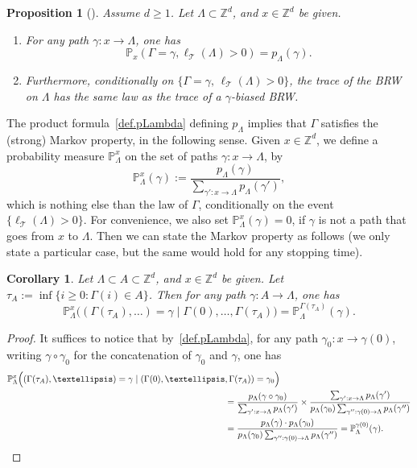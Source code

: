 \documentclass[11pt]{article}
\numberwithin{equation}{section}
\theoremstyle{plain}
\newtheorem{proposition}[theorem]{Proposition}
\newtheorem{corollary}[theorem]{Corollary}
\theoremstyle{definition}
\newcommand\Z{\mathbb{Z}}
\newcommand\T{\mathcal{T}}
\newcommand{\1}{{\text{\Large $\mathfrak 1$}}}
\begin{document}
\begin{proposition}[\cite{Zhu3}] \label{prop.Zhu.spine}
Assume $d\ge 1$. Let $\Lambda\subset \Z^d$,
and $x\in \mathbb Z^d$ be given.
\begin{enumerate}
\item For any path $\gamma:x\to \Lambda$, one has
\begin{equation*}%
\mathbb P_x(\Gamma = \gamma, \ell_{\T}(\Lambda)>0)=p_\Lambda(\gamma).
\end{equation*}
\item Furthermore, conditionally on $\{\Gamma=\gamma,\,
\ell_{\T}(\Lambda)>0\}$, the trace of the BRW
on $\Lambda$ has the same law as the trace of a $\gamma$-biased BRW.
\end{enumerate}
\end{proposition}
The product formula~\eqref{def.pLambda}
defining $p_\Lambda$ implies that $\Gamma$ satisfies the (strong)
Markov property, in the following sense.
Given $x\in \mathbb Z^d$, we define a probability measure $\mathbb P_\Lambda^x$ on the set of paths $\gamma:x\to \Lambda$, by
\[
\mathbb P_\Lambda^x(\gamma ) := \frac{p_\Lambda(\gamma)}{\sum_{\gamma':x\to \Lambda} p_\Lambda(\gamma')},
\]
which is nothing else than the law of $\Gamma$,
conditionally on the event $\{\ell_{\mathcal T}(\Lambda)>0\}$. For convenience, we also set $\mathbb P_\Lambda^x(\gamma) = 0$, if $\gamma$ is not a path that goes from $x$ to $\Lambda$.
Then we can state the Markov property as follows
(we only state a particular case, but the same would hold
for any stopping time).
\begin{corollary}\label{cor.spine.Markov}
Let $\Lambda\!\subset\! A\!\subset\! \mathbb Z^d$, and $x\!\in\! \mathbb Z^d$ be given. Let \hbox{$\tau_A:=\inf\{i\ge 0 :\Gamma(i) \!\in\! A\}$}.
Then for any path $\gamma:A\to \Lambda$, one has
\[
\mathbb P_\Lambda^x\Big((\Gamma(\tau_A), \dots)
=\gamma\mid \Gamma(0),\dots,\Gamma(\tau_A) \Big)
= \mathbb P_\Lambda^{\Gamma(\tau_A)}(\gamma).
\]
\end{corollary}
\begin{proof}
It suffices to notice that by~\eqref{def.pLambda}, for any path $\gamma_0:x\to \gamma(0)$,
writing $\gamma\circ \gamma_0$ for the concatenation of $\gamma_0$ and $\gamma$, one has
\begin{align*}
\mathbb P_\Lambda^x\Big((\Gamma(\tau_A),\dots)= \gamma\mid (\Gamma(0),\dots&,\Gamma(\tau_A)) = \gamma_0 \Big) \\
& = \frac{p_\Lambda(\gamma\circ \gamma_0)}{\sum_{\gamma':x\to \Lambda}p_\Lambda(\gamma')} \times \frac{\sum_{\gamma':x\to \Lambda} p_\Lambda(\gamma')}{p_\Lambda(\gamma_0)\sum_{\gamma'':\gamma(0)\to \Lambda} p_\Lambda(\gamma'')}\\
& = \frac{p_\Lambda(\gamma)\cdot p_\Lambda(\gamma_0)}{p_\Lambda(\gamma_0)\sum_{\gamma'':\gamma(0)\to \Lambda} p_\Lambda(\gamma'')} = \mathbb P_\Lambda^{\gamma(0)}(\gamma).\qedhere
\end{align*}
\end{proof}
\end{document}
